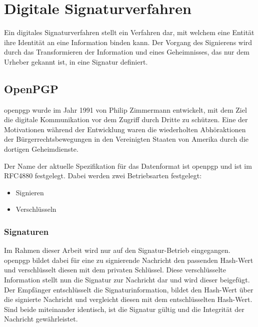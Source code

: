 \section{Digitale Signaturverfahren}
\label{sec:GrundlagenDefinitionen:DigitaleSignaturen:Verfahren}
Ein digitales Signaturverfahren stellt ein Verfahren dar, mit welchem eine Entität ihre Identität an eine Information binden kann. Der Vorgang des Signierens
wird durch das Transformieren der Information und eines Geheimnisses, das nur dem Urheber gekannt ist, in eine Signatur definiert\cite{hac}.

\subsection{OpenPGP}
\label{sec:GrundlagenDefinitionen:DigitaleSignaturen:Verfahren:openpgp}
\gls{openpgp} wurde im Jahr 1991 von Philip Zimmermann\cite{zimmermann:pgp} entwickelt, mit dem Ziel die digitale Kommunikation vor dem Zugriff durch Dritte zu
schützen. Eine der Motivationen während der Entwicklung waren die wiederholten Abhöraktionen der Bürgerrechtsbewegungen in den Vereinigten Staaten von Amerika
durch die dortigen Geheimdienste\cite{singh:messages}.

Der Name der aktuelle Spezifikation für das Datenformat ist \gls{openpgp} und ist im RFC4880\cite{openpgp:ietf} festgelegt. Dabei werden zwei Betriebsarten festgelegt:
\begin{itemize}
    \item Signieren
    \item Verschlüsseln
\end{itemize}

\subsubsection{Signaturen}
Im Rahmen dieser Arbeit wird nur auf den Signatur-Betrieb eingegangen. \gls{openpgp} bildet dabei für eine zu signierende Nachricht den passenden Hash-Wert und
verschlüsselt diesen mit dem privaten Schlüssel. Diese verschlüsselte Information stellt nun die Signatur zur Nachricht dar und wird dieser beigefügt.
Der Empfänger entschlüsselt die Signaturinformation, bildet den Hash-Wert über die signierte Nachricht und vergleicht diesen mit dem entschlüsselten Hash-Wert.
Sind beide miteinander identisch, ist die Signatur gültig und die Integrität der Nachricht gewährleistet.
\cite{hac}\cite{singh:messages}

